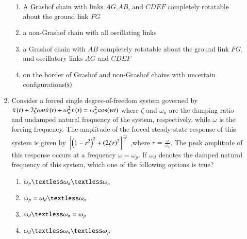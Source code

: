 \documentclass[journal]{IEEEtran}
\begin{document}
\begin{enumerate}
{\begin{figure}[H]
\label{fig:my_label}
\end{figure}
\begin{enumerate}
    \item A Grashof chain with links $AG$,$AB$, and $CDEF$ completely rotatable about the ground link $FG$
    \item a non-Grashof chain with all oscillating links
    \item a Grashof chain with $AB$ completely rotatable about the ground link $FG$, and oscillatory links $AG$ and $CDEF$
    \item on the border of Grashof and non-Grashof chains with uncertain configurations$\left(\text{s}\right)$
\end{enumerate}
}
\item{
Consider a forced single degree-of-freedom system governed by
$\ddot{x}\left(t\right)+2\zeta\omega n\dot{x}\left(t\right)+\omega_n^2x\left(t\right)=\omega_n^2 \cos(wt)$
where $\zeta$ and $\omega_n$ are the damping ratio and undamped natural frequency of the system, respectively, while $\omega$ is the forcing frequency. The amplitude of the forced steady-state response of this system is given by ${}\left[\left(1-r^2\right)^2+\left(2\zeta r\right)^2\right]^{\frac{-1}{2}}$ ,where 
$r=\frac{\omega}{\omega_n}$. The peak amplitude of this response occurs at a frequency $\omega=\omega_p$. If $\omega_d$ denotes the damped natural frequency of this system, which one of the following options is true?
\begin{multicols}{2}
    \begin{enumerate}
        \item $\omega_p\textless\omega_d\textless\omega_n$
        \item $\omega_p=\omega_d\textless\omega_n$
        \item $\omega_d\textless\omega_n=\omega_p$
        \item $\omega_d\textless\omega_n\textless\omega_p$
    \end{enumerate}
\end{multicols}
}
\end{enumerate}
\end{document}
